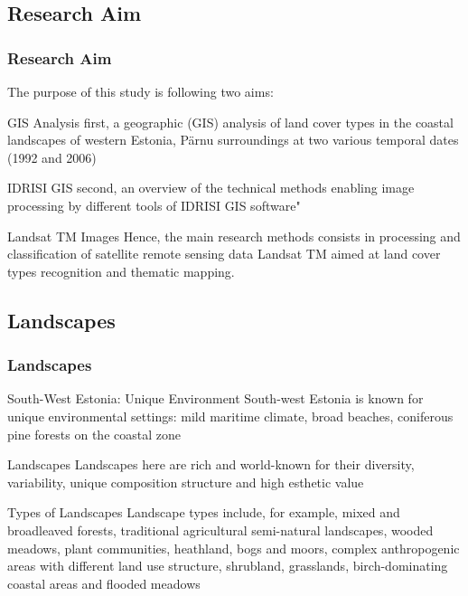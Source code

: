 \documentclass[pdflatex,compress,9pt,
	xcolor={dvipsnames,dvipsnames,svgnames,x11names,table},
	hyperref={colorlinks = true,breaklinks = true, urlcolor = NavyBlue, breaklinks = true}]{beamer}
\begin{document}
\subsection{Research Aim}
\begin{frame}\frametitle{Research Aim}
The purpose of this study is following \alert{two aims}:
\begin{alertblock}{GIS Analysis}
first, a geographic (GIS) analysis of land cover types in the coastal landscapes of western Estonia, P\"{a}rnu surroundings at two various temporal dates (\alert{1992} and \alert{2006})
\end{alertblock}

\begin{block}{IDRISI GIS}
second, an overview of the technical methods enabling image processing by different tools of IDRISI GIS software"
\end{block}

\begin{block}{Landsat TM Images}
Hence, the main research methods consists in processing and classification of satellite remote sensing data Landsat TM aimed at land cover types recognition and thematic mapping.
\end{block}

\end{frame}

\subsection{Landscapes}
\begin{frame}\frametitle{Landscapes}

\begin{block}{South-West Estonia: Unique Environment}
South-west Estonia is known for unique environmental settings: mild maritime climate, broad beaches, coniferous pine forests on the coastal zone
\end{block}

\begin{alertblock}{Landscapes}
Landscapes here are rich and world-known for their diversity, variability, unique composition structure and high esthetic value
\end{alertblock}

\begin{examples}{Types of Landscapes}
Landscape types include, for example, mixed and broadleaved forests, traditional agricultural semi-natural landscapes, wooded meadows, plant communities, heathland, bogs and moors, complex anthropogenic areas with different land use structure, shrubland, grasslands, birch-dominating coastal areas and flooded meadows
\end{examples}

\end{frame}
\end{document}
